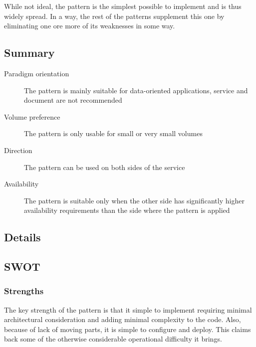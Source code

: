 \documentclass[10pt,a4paper]{article}
\begin{document}
While not ideal, the pattern is the simplest possible to implement and is thus widely spread. In a way, the rest of the patterns supplement this one by eliminating one ore more of its weaknesses in some way.

\subsection{Summary}
\begin{description}
	\item[Paradigm orientation] The pattern is mainly suitable for data-oriented applications, service and document are not recommended
	\item[Volume preference] The pattern is only usable for small or very small volumes
	\item[Direction] The pattern can be used on both sides of the service
	\item[Availability] The pattern is suitable only when the other side has significantly higher availability requirements than the side where the pattern is applied
\end{description}

\subsection{Details}

\subsection{SWOT}
\subsubsection{Strengths}
The key strength of the pattern is that it simple to implement requiring minimal architectural consideration and adding minimal complexity to the code. Also, because of lack of moving parts, it is simple to configure and deploy. This claims back some of the otherwise considerable operational difficulty it brings.
\end{document}
